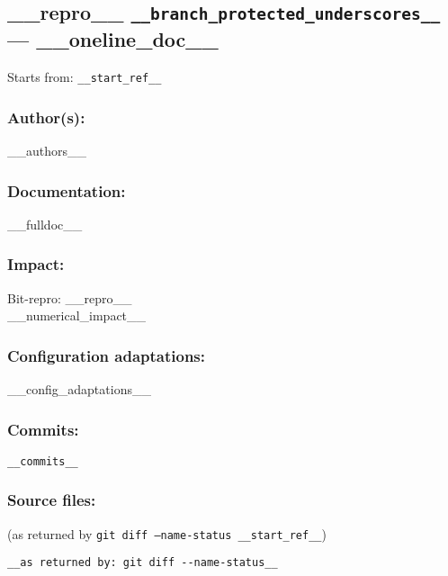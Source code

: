 \newpage
\subsection{__repro__ \texttt{__branch_protected_underscores__} --- __oneline_doc__}
\label{branch:__branch__}
Starts from: \texttt{__start_ref__}

\subsubsection*{Author(s):}
__authors__

\subsubsection*{Documentation:}
__fulldoc__

\subsubsection*{Impact:}
\noindent Bit-repro: __repro__\\
__numerical_impact__

\subsubsection*{Configuration adaptations:}
__config_adaptations__

\subsubsection*{Commits:}
\begin{lstlisting}
__commits__
\end{lstlisting}

\subsubsection*{Source files:}
(as returned by \texttt{git diff --name-status __start_ref__})\\
\begin{lstlisting}
__as returned by: git diff --name-status__
\end{lstlisting}

